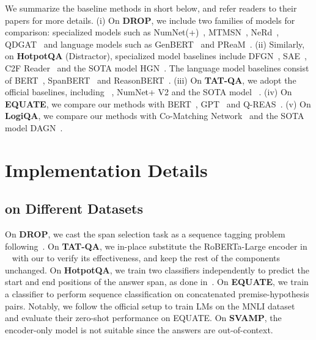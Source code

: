 We summarize the baseline methods in short below, and refer readers to their papers for more details.
(i) On \textbf{DROP}, we include two families of models for comparison: specialized models such as NumNet(+)~\citep{ran-etal-2019-numnet}, MTMSN~\citep{hu-etal-2019-multi}, NeRd~\citep{Chen2020Neural}, QDGAT~\cite{chen-etal-2020-question} and language models such as GenBERT~\citep{geva-etal-2020-injecting} and  PReaM~\citep{DBLP:journals/corr/abs-2107-07261}.
(ii) Similarly, on \textbf{HotpotQA} (Distractor), specialized model baselines include DFGN~\citep{qiu-etal-2019-dynamically}, SAE~\citep{DBLP:conf/aaai/TuHW0HZ20}, C2F Reader~\citep{shao-etal-2020-graph} and the SOTA model HGN~\citep{fang-etal-2020-hierarchical}. The language model baselines consist of BERT~\citep{devlin-etal-2019-bert}, SpanBERT~\citep{joshi-etal-2020-spanbert} and ReasonBERT~\citep{deng2021reasonbert}.
(iii) On \textbf{TAT-QA}, we adopt the official baselines, including \tapas~\citep{herzig-etal-2020-tapas}, NumNet+ V2 and the SOTA model \tagop~\citep{zhu-etal-2021-tat}.
(iv) On \textbf{EQUATE}, we compare our methods with BERT~\citep{devlin-etal-2019-bert}, GPT~\citep{radford2019language} and Q-REAS~\citep{ravichander-etal-2019-equate}.
(v) On \textbf{LogiQA}, we compare our methods with Co-Matching Network~\citep{wang-etal-2018-co} and the SOTA model DAGN~\citep{huang-etal-2021-dagn}.


\section{Implementation Details}\label{sec:append_imp}

\subsection{\oursroberta on Different Datasets}

On \textbf{DROP}, we cast the span selection task as a sequence tagging problem following~\citet{segal-etal-2020-simple}.
On \textbf{TAT-QA}, we in-place substitute the RoBERTa-Large encoder in \tagop~\citep{zhu-etal-2021-tat} with our \oursroberta to verify its effectiveness, and keep the rest of the components unchanged.
On \textbf{HotpotQA}, we train two classifiers independently to predict the start and end positions of the answer span, as done in~\citet{devlin-etal-2019-bert}.
On \textbf{EQUATE}, we train a classifier to perform sequence classification on concatenated premise-hypothesis pairs.
Notably, we follow the official setup to train LMs on the MNLI dataset~\cite{williams-etal-2018-broad} and evaluate their zero-shot performance on EQUATE.
On \textbf{SVAMP}, the encoder-only model is not suitable since the answers are out-of-context.


